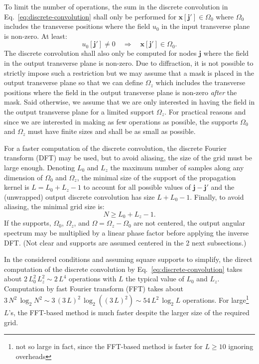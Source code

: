 \documentclass[a4paper]{article}
\newcommand{\oops}[1]{{\color{purple}#1}}
\newcommand{\V}[1]{\boldsymbol{#1}}
\newcommand*{\Set}[1]{\mathbb{#1}}
\begin{document}
To limit the number of operations, the sum in the discrete convolution in
Eq.~\eqref{eq:discrete-convolution} shall only be performed for
$\V{x}[\V{j}'] \in Ω_{0}$ where $Ω_{0}$ includes the transverse positions where
the field $u_{0}$ in the input transverse plane is non-zero. At least:
\begin{equation}
  \label{eq:input-field-support}
  u_{0}[\V{j}']
  \not= 0
  \quad\Longrightarrow\quad
  \V{x}[\V{j}'] \in Ω_{0}.
\end{equation}
The discrete convolution shall also only be computed for nodes $\V{j}$ where
the field in the output transverse plane is non-zero. Due to diffraction, it is
not possible to strictly impose such a restriction but we may assume that a
mask is placed in the output transverse plane so that we can define $Ω_{z}$
which includes the transverse positions where the field in the output
transverse plane is non-zero \emph{after} the mask. Said otherwise, we assume
that we are only interested in having the field in the output transverse plane
for a limited support $Ω_{z}$. For practical reasons and since we are
interested in making as few operations as possible, the supports $Ω_{0}$ and
$Ω_{z}$ must have finite sizes and shall be as small as possible.

For a faster computation of the discrete convolution, the discrete Fourier
transform (DFT) may be used, but to avoid aliasing, the size of the grid must
be large enough. Denoting $L_{0}$ and $L_{z}$ the maximum number of samples
along any dimension of $Ω_{0}$ and $Ω_{z}$, the minimal size of the support of
the propagation kernel is $L = L_{0} + L_{z} - 1$ to account for all possible
values of $\V{j} - \V{j}'$ and the (unwrapped) output discrete convolution has
size $L + L_{0} - 1$. Finally, to avoid aliasing, the minimal grid size is:
\begin{equation}
  \label{eq:convolution-grid-size}
  N ≥ L_{0} + L_{z} - 1.
\end{equation}
If the supports, $Ω_{0}$, $Ω_{z}$, and $Ω = Ω_{z} - Ω_{0}$ are not centered,
the output angular spectrum may be multiplied by a linear phase factor before
applying the inverse DFT. \oops{(Not clear and supports are assumed centered in
  the 2 next subsections.)}

In the considered conditions and assuming square supports to simplify, the
direct computation of the discrete convolution by
Eq.~\eqref{eq:discrete-convolution} takes about
$2\,L_{0}^{2}\,L_{z}^{2} \sim 2\,L^{4}$ operations with $L$ the typical value
of $L_{0}$ and $L_{z}$. Computation by fast Fourier transform (FFT) takes about
$3\,N^{2}\,\log_{2}N^{2} \sim 3\,(3\,L)^{2}\,\log_{2}((3\,L)^{2}) \sim 54\,L^{2}\,\log_{2}L$
operations. For large\footnote{not so large in fact, since the FFT-based method
  is faster for $L ≥ 10$ ignoring overheads} $L$'s, the FFT-based method is
much faster despite the larger size of the required grid.
\end{document}
